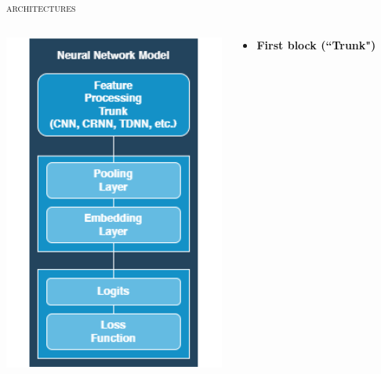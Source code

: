 \documentclass[10pt,aspectratio=1610,professionalfont]{beamer}
\begin{document}
\begin{frame}{\textsc{architectures}}
	\begin{columns}
		\begin{column}{0.3\textwidth}
		   	\begin{center}
		     	\includegraphics[width=1.1\textwidth]{img/architecture.png}
		    	\end{center}
		\end{column}
		\begin{column}{0.5\textwidth}  %
			\begin{itemize}
		        \item \textbf{First block (``Trunk")}
		        \begin{itemize}

\end{itemize}
\end{itemize}
\end{column}
\end{columns}
\end{frame}
\end{document}
